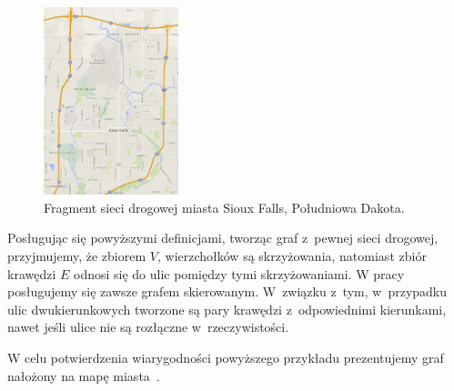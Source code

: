 \documentclass[twoside,12pt]{report}
\begin{document}
\begin{figure}[ht]
\begin{center}
\includegraphics[width=0.35\textwidth]{img/siec}
\caption{Fragment sieci drogowej miasta Sioux Falls, Południowa Dakota.} 
\end{center}
\end{figure}

Posługując się powyższymi definicjami, tworząc graf z~pewnej sieci drogowej, przyjmujemy, że zbiorem $V$, wierzchołków są skrzyżowania, natomiast zbiór krawędzi $E$ odnosi się do ulic pomiędzy tymi skrzyżowaniami.
W pracy posługujemy się zawsze grafem skierowanym. W~związku z~tym, w~przypadku ulic dwukierunkowych tworzone są pary krawędzi z~odpowiednimi kierunkami, nawet jeśli ulice nie są rozłączne w~rzeczywistości.

W celu potwierdzenia wiarygodności powyższego przykładu prezentujemy graf nałożony na mapę miasta~\cite{siux}.
\end{document}
